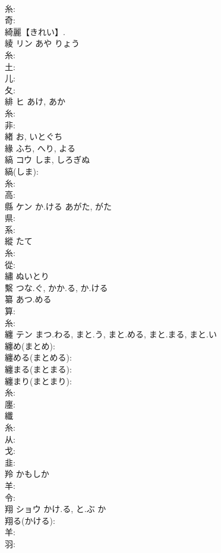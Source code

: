 \documentclass[8pt]{extreport}
\begin{document}
\begin{CJK}{UTF8}{min}
\\	糸: 
\\	奇: 
\\	綺麗【きれい】.
\\	綾	リン	あや	りょう	
\\	糸: 
\\	土: 
\\	儿: 
\\	夂: 
\\	緋	ヒ	あけ, あか		
\\	糸: 
\\	非: 
\\	緖		お, いとぐち				
\\	緣		ふち, へり, よる				
\\	縞	コウ	しま, しろぎぬ		
\\	縞(しま): 
\\	糸: 
\\	高: 
\\	縣	ケン	か.ける	あがた, がた			
\\	県: 
\\	系: 
\\	縱		たて				
\\	糸: 
\\	從: 
\\	繡		ぬいとり				
\\	繫		つな.ぐ, かか.る, か.ける				
\\	纂		あつ.める				
\\	算: 
\\	糸: 
\\	纏	テン	まつ.わる, まと.う, まと.める, まと.まる, まと.い		
\\	纏め(まとめ): 
\\	纏める(まとめる): 
\\	纏まる(まとまる): 
\\	纏まり(まとまり): 
\\	糸: 
\\	廛: 
\\	纖						
\\	糸: 
\\	从: 
\\	戈: 
\\	韭: 
\\	羚		かもしか				
\\	羊: 
\\	令: 
\\	翔	ショウ	かけ.る, と.ぶ	か	
\\	翔る(かける): 
\\	羊: 
\\	羽: 

\end{CJK}
\end{document}
